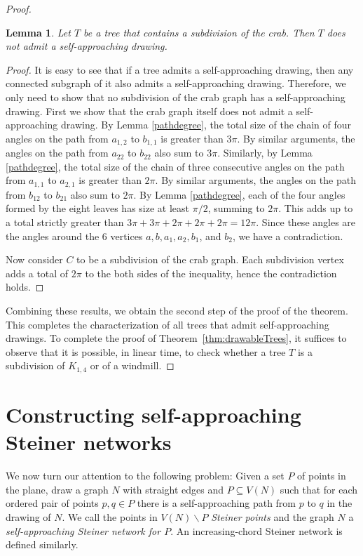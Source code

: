 \documentclass[11pt]{article}
\newtheorem{lemma}[theorem]{Lemma}
\newcommand{\changeS}[1]{{#1}}
\begin{document}
\begin{proof}
\begin{lemma}
\label{subcrablemma}
Let $T$ be a tree that contains a subdivision of the crab.  Then $T$ does not admit a self-approaching drawing.
\end{lemma}
\begin{proof}
It is easy to see that if a tree admits a self-approaching drawing, then any connected subgraph of it also admits a self-approaching drawing. Therefore, we only need to show that no subdivision of the crab graph has a self-approaching drawing. \changeS{First we show that the crab graph itself does not admit a self-approaching drawing.} By Lemma \ref{pathdegree}, the total size of the chain of four angles on the path from $a_{1,2}$ to $b_{1,1}$ is greater than $3\pi$. By similar arguments, the angles on the path from $a_{22}$ to $b_{22}$ also sum to $3\pi$. Similarly, by Lemma \ref{pathdegree}, the total size of the chain of three consecutive angles on the path from $a_{1,1}$ to $a_{2,1}$ is greater than $2\pi$. By similar arguments, the angles on the path from $b_{12}$ to $b_{21}$ also sum to $2\pi$. By Lemma \ref{pathdegree}, each of the four angles formed by the eight leaves has size at least $\pi/2$, summing to $2\pi$. This adds up to a total strictly greater than $3\pi+3\pi+2\pi+2\pi+2\pi = 12\pi$. Since these angles are the angles around the $6$ vertices $a, b, a_{1},a_{2},b_{1}$, and $b_{2}$, we have a contradiction.

\changeS{Now consider $C$ to be a subdivision of the crab graph. Each subdivision vertex adds a total of $2\pi$ to the both sides of the inequality, hence the contradiction holds.}
\end{proof}

Combining these results, we obtain the second step of the proof of the theorem.  This completes the characterization of all trees that admit self-approaching drawings.  To complete the proof of Theorem~\ref{thm:drawableTrees}, it suffices to observe that it is possible, in linear time, to check whether a tree $T$ is a subdivision of $K_{1,4}$ or of a windmill.
\end{proof}




\section{Constructing self-approaching Steiner networks}
\label{sec:SAspanners}
We now turn our attention to the following problem: Given a set $P$ of points in the plane, draw a graph $N$ with straight edges and $P\subseteq V(N)$ such that for each ordered pair of points $p,q\in P$ there is a self-approaching path from $p$ to $q$ in the drawing of $N$. We call the points in $V(N)\backslash P$  \emph{Steiner points} and the graph $N$ a \emph{self-approaching Steiner network for $P$}. An increasing-chord Steiner network is defined similarly.
\end{document}
